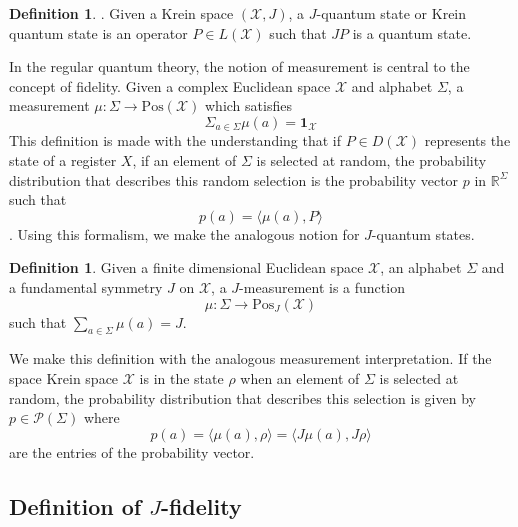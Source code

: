 \documentclass{amsart}
\numberwithin{equation}{section}
\theoremstyle{definition}
\newtheorem{definition}[theorem]{Definition}
\theoremstyle{plain}
\theoremstyle{solutionstyle}
\begin{document}
\begin{definition}\cite{FelipeSosa2022}.
    Given a Krein space $(\mathcal{X}, J)$, a $J$-quantum state or Krein quantum state is an operator $P\in L(\mathcal{X})$ such that $JP$ is a quantum state.
\end{definition}
In the regular quantum theory, the notion of measurement is central to the concept of fidelity. Given a complex Euclidean space $\mathcal{X}$ and alphabet $\Sigma$, a measurement $\mu:\Sigma \to \mathrm{Pos}(\mathcal{X})$ which satisfies 
\begin{equation*}\Sigma_{a\in \Sigma} \mu(a)=\mathbf{1}_{\mathcal{X}}\end{equation*}   This definition is made with the understanding that if $P\in D(\mathcal{X})$ represents the state of a register $X$, if an element of $\Sigma$ is selected at random, the probability distribution that describes this random selection is the probability vector $p$ in $\mathbb{R}^{\Sigma}$ such that
\begin{equation*}p(a)=\langle \mu(a), P\rangle\end{equation*} \cite[p.~101]{Watrous_2018}.
Using this formalism, we make the analogous notion for $J$-quantum states.






\begin{definition}
    Given a finite dimensional Euclidean space $\mathcal{X}$, an alphabet $\Sigma$ and a fundamental symmetry $J$ on $\mathcal{X}$, a $J$-measurement is a function 
    \begin{equation*}\mu:\Sigma\to \mathrm{Pos}_J(\mathcal{X})\end{equation*}
    such that $\sum_{a\in\Sigma}\mu(a)=J$.
\end{definition}
We make this definition with the analogous measurement interpretation. If the space Krein space $\mathcal{X}$ is in the state $\rho$ when an element of $\Sigma$ is selected at random, the probability distribution that describes this selection is given by $p\in \mathcal{P}(\Sigma)$ where 
\begin{equation*}p(a)=\langle \mu(a), \rho\rangle = \langle J\mu(a),J\rho\rangle  \end{equation*}
are the entries of the probability vector.



\subsection{Definition of \texorpdfstring{$J$}{J}-fidelity}
\end{document}
